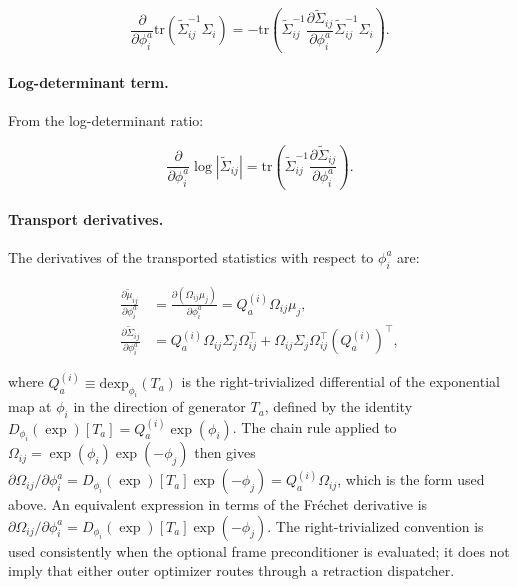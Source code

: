 \documentclass[twoside,11pt]{article}
\begin{document}
\begin{equation}
\frac{\partial}{\partial \phi_i^a}\mathrm{tr}(\tilde{\Sigma}_{ij}^{-1}\Sigma_i)
= -\mathrm{tr} \left(\tilde{\Sigma}_{ij}^{-1} \frac{\partial \tilde{\Sigma}_{ij}}{\partial \phi_i^a} \tilde{\Sigma}_{ij}^{-1} \Sigma_i\right).
\label{eq:trace_term_phi}
\end{equation}

\paragraph{Log-determinant term.} From the log-determinant ratio:

\begin{equation}
\frac{\partial}{\partial \phi_i^a}\log|\tilde{\Sigma}_{ij}|
= \mathrm{tr} \left(\tilde{\Sigma}_{ij}^{-1} \frac{\partial \tilde{\Sigma}_{ij}}{\partial \phi_i^a}\right).
\label{eq:logdet_term_phi}
\end{equation}

\paragraph{Transport derivatives.} The derivatives of the transported statistics with respect to $\phi_i^a$ are:

\begin{align}
\frac{\partial \tilde{\mu}_{ij}}{\partial \phi_i^a} &= \frac{\partial (\Omega_{ij}\mu_j)}{\partial \phi_i^a}
= Q_a^{(i)} \Omega_{ij} \mu_j, \label{eq:dtilde_mu} \\
\frac{\partial \tilde{\Sigma}_{ij}}{\partial \phi_i^a} &=
Q_a^{(i)} \Omega_{ij} \Sigma_j \Omega_{ij}^\top
+ \Omega_{ij} \Sigma_j \Omega_{ij}^\top (Q_a^{(i)})^\top, \label{eq:dtilde_Sigma}
\end{align}

where $Q_a^{(i)} \equiv \mathrm{dexp}_{\phi_i}(T_a)$ is the right-trivialized differential of the exponential map at $\phi_i$ in the direction of generator $T_a$, defined by the identity $D_{\phi_i}(\exp)[T_a] = Q_a^{(i)} \exp(\phi_i)$. The chain rule applied to $\Omega_{ij} = \exp(\phi_i)\exp(-\phi_j)$ then gives $\partial \Omega_{ij}/\partial \phi_i^a = D_{\phi_i}(\exp)[T_a] \exp(-\phi_j) = Q_a^{(i)} \Omega_{ij}$, which is the form used above. An equivalent expression in terms of the Fr\'echet derivative is $\partial \Omega_{ij}/\partial \phi_i^a = D_{\phi_i}(\exp)[T_a] \exp(-\phi_j)$. The right-trivialized convention is used consistently when the optional frame preconditioner is evaluated; it does not imply that either outer optimizer routes through a retraction dispatcher.
\end{document}
